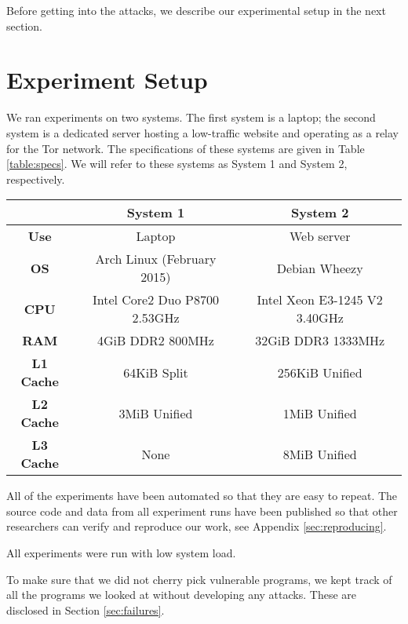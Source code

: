 \documentclass[letterpaper,twocolumn,10pt]{article}
\begin{document}
Before getting into the attacks, we describe our experimental setup in the next
section.

\section{Experiment Setup}

We ran experiments on two systems. The first system is a laptop; the second
system is a dedicated server hosting a low-traffic website and operating as
a relay for the Tor network. The specifications of these systems are given in
Table \ref{table:specs}. We will refer to these systems as System 1 and System
2, respectively.

\begin{table*}
    \centering
\begin{tabular}{|c|c|c|}
    \hline
    & \textbf{System 1} & \textbf{System 2} \\
    \hline
    \textbf{Use} & Laptop & Web server \\
    \hline
    \textbf{OS} & Arch Linux (February 2015) & Debian Wheezy \\
    \hline
    \textbf{CPU} & Intel Core2 Duo P8700 2.53GHz & Intel Xeon E3-1245 V2 3.40GHz  \\
    \hline
    \textbf{RAM} & 4GiB DDR2 800MHz & 32GiB DDR3 1333MHz \\
    \hline
    \textbf{L1 Cache} & 64KiB Split & 256KiB Unified \\
    \hline
    \textbf{L2 Cache} & 3MiB Unified & 1MiB Unified \\
    \hline
    \textbf{L3 Cache} & None & 8MiB Unified \\
    \hline
\end{tabular}
\caption{System specifications. Cache specifications were obtained by the
\texttt{dmidecode} utility and may not be accurate. System 1 does not have a L3
cache, but FLUSH+RELOAD works with its L2 cache as it is shared between cores.}
\label{table:specs}
\end{table*}

All of the experiments have been automated so that they are easy to repeat. The
source code and data from all experiment runs have been published so that other
researchers can verify and reproduce our work, see Appendix
\ref{sec:reproducing}.

All experiments were run with low system load.

To make sure that we did not cherry pick vulnerable programs, we kept track of
all the programs we looked at without developing any attacks. These are
disclosed in Section \ref{sec:failures}.
\end{document}
